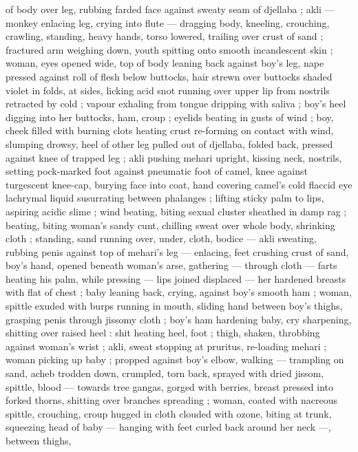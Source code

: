 of body over leg, rubbing farded face against sweaty seam of 
djellaba ; akli --- monkey enlacing leg, crying into flute --- dragging 
body, kneeling, crouching, crawling, standing, heavy hands, torso 
lowered, trailing over crust of sand ; fractured arm weighing down, 
youth spitting onto smooth incandescent skin ; woman, eyes opened 
wide, top of body leaning back against boy's leg, nape pressed 
against roll of flesh below buttocks, hair strewn over buttocks shaded 
violet in folds, at sides, licking acid snot running over upper lip from 
nostrils retracted by cold ; vapour exhaling from tongue dripping with 
saliva ; boy's heel digging into her buttocks, ham, croup ; eyelids 
beating in gusts of wind ; boy, cheek filled with burning clots heating 
crust re-forming on contact with wind, slumping drowsy, heel of other 
leg pulled out of djellaba, folded back, pressed against knee of 
trapped leg ; akli pushing mehari upright, kissing neck, nostrils, 
setting pock-marked foot against pneumatic foot of camel, knee 
against turgescent knee-cap, burying face into coat, hand covering 
camel's cold flaccid eye {\col} lachrymal liquid susurrating between 
phalanges ; lifting sticky palm to lips, aspiring acidic slime ; wind 
beating, biting sexual cluster sheathed in damp rag ; beating, biting 
woman's sandy cunt, chilling sweat over whole body, shrinking cloth 
; standing, sand running over, under, cloth, bodice --- akli sweating, 
rubbing penis against top of mehari's leg --- enlacing, feet crushing 
crust of sand, boy's hand, opened beneath woman's arse, gathering 
--- through cloth --- farts heating his palm, while pressing --- lips 
joined displaced --- her hardened breasts with flat of chest ; baby 
leaning back, crying, against boy's smooth ham ; woman, spittle 
exuded with burps running in mouth, sliding hand between boy's 
thighs, grasping penis through jissomy cloth ; boy's ham hardening 
{\col} baby, cry sharpening, shitting over raised heel : shit heating heel, 
foot ; thigh, shaken, throbbing against woman's wrist ; akli, sweat 
stopping at pruritus, re-loading mehari ; woman picking up baby ; 
propped against boy's elbow, walking --- trampling on sand, acheb 
trodden down, crumpled, torn back, sprayed with dried jissom, 
spittle, blood --- towards tree {\col} gangas, gorged with berries, breast 
pressed into forked thorns, shitting over branches spreading ; 
woman, coated with nacreous spittle, crouching, croup hugged in 
cloth clouded with ozone, biting at trunk, squeezing head of baby --- 
hanging with feet curled back around her neck ---, between thighs, 
